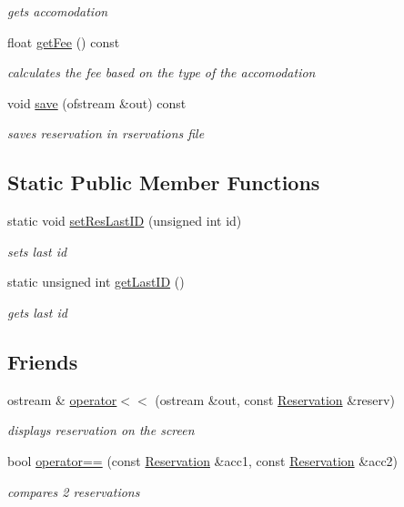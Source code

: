 \begin{DoxyCompactItemize}
\begin{DoxyCompactList}\small\item\em gets accomodation \end{DoxyCompactList}\item 
float \hyperlink{class_reservation_a5d2e10ceb53e119bede30b6e36d39f4d}{get\+Fee} () const
\begin{DoxyCompactList}\small\item\em calculates the fee based on the type of the accomodation \end{DoxyCompactList}\item 
void \hyperlink{class_reservation_aaa4ab6143a49aeb8b4cac348bae44ea2}{save} (ofstream \&out) const
\begin{DoxyCompactList}\small\item\em saves reservation in rservations file \end{DoxyCompactList}\end{DoxyCompactItemize}
\subsection*{Static Public Member Functions}
\begin{DoxyCompactItemize}
\item 
static void \hyperlink{class_reservation_ad4f0df816beef2705e8b1ac555ce6243}{set\+Res\+Last\+ID} (unsigned int id)
\begin{DoxyCompactList}\small\item\em sets last id \end{DoxyCompactList}\item 
static unsigned int \hyperlink{class_reservation_ae4d593787bc501a8e4a47ba6b232ff1f}{get\+Last\+ID} ()
\begin{DoxyCompactList}\small\item\em gets last id \end{DoxyCompactList}\end{DoxyCompactItemize}
\subsection*{Friends}
\begin{DoxyCompactItemize}
\item 
ostream \& \hyperlink{class_reservation_ad08627b6936df4b1b1a5c0351355ffbe}{operator$<$$<$} (ostream \&out, const \hyperlink{class_reservation}{Reservation} \&reserv)
\begin{DoxyCompactList}\small\item\em displays reservation on the screen \end{DoxyCompactList}\item 
bool \hyperlink{class_reservation_aedba0fd671214e780c8933b23585b0c9}{operator==} (const \hyperlink{class_reservation}{Reservation} \&acc1, const \hyperlink{class_reservation}{Reservation} \&acc2)
\begin{DoxyCompactList}\small\item\em compares 2 reservations \end{DoxyCompactList}\end{DoxyCompactItemize}


